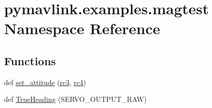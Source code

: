\hypertarget{namespacepymavlink_1_1examples_1_1magtest}{}\section{pymavlink.\+examples.\+magtest Namespace Reference}
\label{namespacepymavlink_1_1examples_1_1magtest}
\subsection*{Functions}
\begin{DoxyCompactItemize}
\item 
def \mbox{\hyperlink{namespacepymavlink_1_1examples_1_1magtest_a85f95abe31f900d634b0c548cb8263cb}{set\+\_\+attitude}} (\mbox{\hyperlink{namespacepymavlink_1_1examples_1_1magtest_a5f4f85280403824f4515003203b490b6}{rc3}}, \mbox{\hyperlink{namespacepymavlink_1_1examples_1_1magtest_aa9bde9712f6ffdff13b645156c09dfab}{rc4}})
\item 
def \mbox{\hyperlink{namespacepymavlink_1_1examples_1_1magtest_a5318e4afc641238e99eea2d28a2b4128}{True\+Heading}} (S\+E\+R\+V\+O\+\_\+\+O\+U\+T\+P\+U\+T\+\_\+\+R\+AW)
\end{DoxyCompactItemize}
